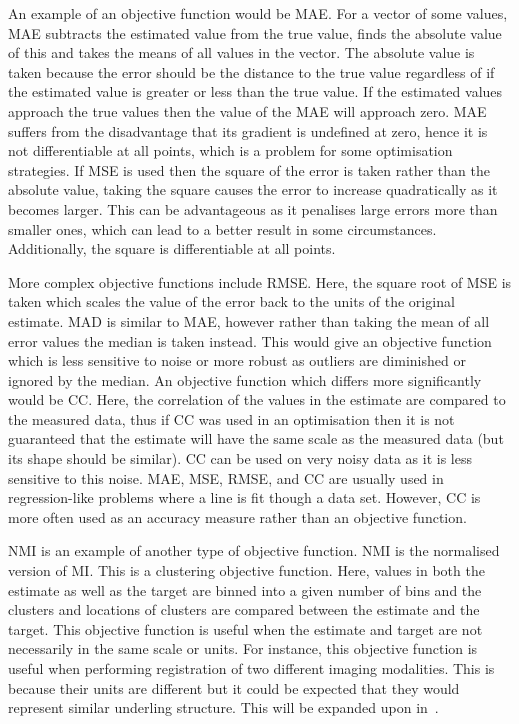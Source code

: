                 An example of an objective function would be \gls{MAE}. For a vector of some values, \gls{MAE} subtracts the estimated value from the true value, finds the absolute value of this and takes the means of all values in the vector. The absolute value is taken because the error should be the distance to the true value regardless of if the estimated value is greater or less than the true value. If the estimated values approach the true values then the value of the \gls{MAE} will approach zero. \gls{MAE} suffers from the disadvantage that its gradient is undefined at zero, hence it is not differentiable at all points, which is a problem for some optimisation strategies. If \gls{MSE} is used then the square of the error is taken rather than the absolute value, taking the square causes the error to increase quadratically as it becomes larger. %
                This can be advantageous as it penalises large errors more than smaller ones, which can lead to a better result in some circumstances. Additionally, the square is differentiable at all points.
                
                More complex objective functions include \gls{RMSE}. Here, the square root of \gls{MSE} is taken which scales the value of the error back to the units of the original estimate. \gls{MAD} is similar to \gls{MAE}, however rather than taking the mean of all error values the median is taken instead. This would give an objective function which is less sensitive to noise or more robust as outliers are diminished or ignored by the median. An objective function which differs more significantly would be \gls{CC}. Here, the correlation of the values in the estimate are compared to the measured data, thus if \gls{CC} was used in an optimisation then it is not guaranteed that the estimate will have the same scale as the measured data (but its shape should be similar). \gls{CC} can be used on very noisy data as it is less sensitive to this noise. \gls{MAE}, \gls{MSE}, \gls{RMSE}, and \gls{CC} are usually used in regression-like problems where a line is fit though a data set. However, \gls{CC} is more often used as an accuracy measure rather than an objective function.

                \gls{NMI} is an example of another type of objective function. \gls{NMI} is the normalised version of \gls{MI}. This is a clustering objective function. Here, values in both the estimate as well as the target are binned into a given number of bins and the clusters and locations of clusters are compared between the estimate and the target. This objective function is useful when the estimate and target are not necessarily in the same scale or units. For instance, this objective function is useful when performing registration of two different imaging modalities. This is because their units are different but it could be expected that they would represent similar underling structure. This will be expanded upon in~.
                

